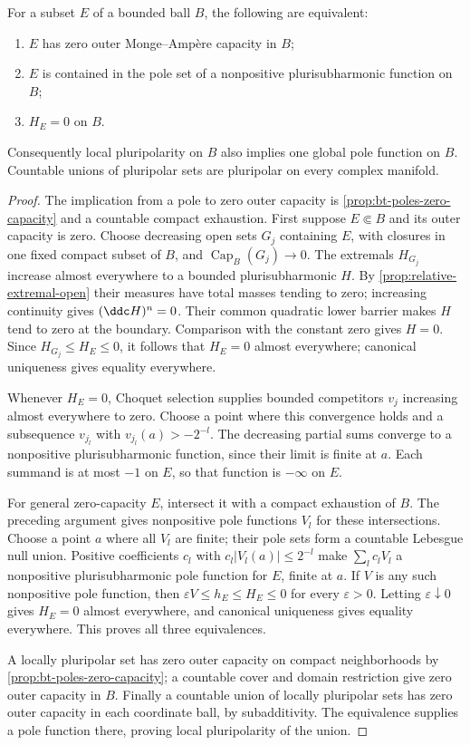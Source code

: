 \begin{theorem}\label{thm:zero-capacity-pluripolar}
For a subset $E$ of a bounded ball $B$, the following are equivalent:
\begin{enumerate}
\item $E$ has zero outer Monge--Amp\`ere capacity in $B$;
\item $E$ is contained in the pole set of a nonpositive plurisubharmonic function on $B$;
\item $H_E=0$ on $B$.
\end{enumerate}
Consequently local pluripolarity on $B$ also implies one global pole function on $B$. Countable unions of pluripolar sets are pluripolar on every complex manifold.
\end{theorem}
\begin{proof}
The implication from a pole to zero outer capacity is \cref{prop:bt-poles-zero-capacity} and a countable compact exhaustion. First suppose $E\Subset B$ and its outer capacity is zero. Choose decreasing open sets $G_j$ containing $E$, with closures in one fixed compact subset of $B$, and $\operatorname{Cap}_B(G_j)\to0$. The extremals $H_{G_j}$ increase almost everywhere to a bounded plurisubharmonic $H$. By \cref{prop:relative-extremal-open} their measures have total masses tending to zero; increasing continuity gives $(\ddc H)^n=0$. Their common quadratic lower barrier makes $H$ tend to zero at the boundary. Comparison with the constant zero gives $H=0$. Since $H_{G_j}\le H_E\le0$, it follows that $H_E=0$ almost everywhere; canonical uniqueness gives equality everywhere.

Whenever $H_E=0$, Choquet selection supplies bounded competitors $v_j$ increasing almost everywhere to zero. Choose a point where this convergence holds and a subsequence $v_{j_l}$ with $v_{j_l}(a)>-2^{-l}$. The decreasing partial sums converge to a nonpositive plurisubharmonic function, since their limit is finite at $a$. Each summand is at most $-1$ on $E$, so that function is $-\infty$ on $E$.

For general zero-capacity $E$, intersect it with a compact exhaustion of $B$. The preceding argument gives nonpositive pole functions $V_l$ for these intersections. Choose a point $a$ where all $V_l$ are finite; their pole sets form a countable Lebesgue null union. Positive coefficients $c_l$ with $c_l|V_l(a)|\le2^{-l}$ make $\sum_lc_lV_l$ a nonpositive plurisubharmonic pole function for $E$, finite at $a$. If $V$ is any such nonpositive pole function, then $\varepsilon V\le h_E\le H_E\le0$ for every $\varepsilon>0$. Letting $\varepsilon\downarrow0$ gives $H_E=0$ almost everywhere, and canonical uniqueness gives equality everywhere. This proves all three equivalences.

A locally pluripolar set has zero outer capacity on compact neighborhoods by \cref{prop:bt-poles-zero-capacity}; a countable cover and domain restriction give zero outer capacity in $B$. Finally a countable union of locally pluripolar sets has zero outer capacity in each coordinate ball, by subadditivity. The equivalence supplies a pole function there, proving local pluripolarity of the union.
\end{proof}


